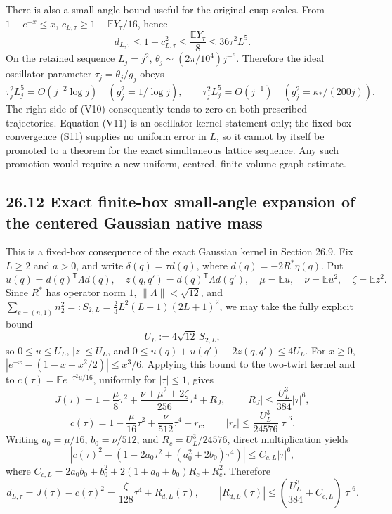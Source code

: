 \documentclass[
  11pt,
]{article}
\begin{document}
There is also a small-angle bound useful for the original cusp scales.
From \(1-e^{-x}\le x\), \(c_{L,\tau}\ge1-\mathbb EY_\tau/16\), hence \[
 d_{L,\tau}\le1-c_{L,\tau}^2
 \le\frac{\mathbb EY_\tau}{8}
 \le36\tau^2L^5. \tag{V10}
\] On the retained sequence \(L_j=j^2\),
\(\theta_j\sim(2\pi/10^4)j^{-6}\). Therefore the ideal oscillator
parameter \(\tau_j=\theta_j/g_j\) obeys \[
 \tau_j^2L_j^5=O(j^{-2}\log j)\quad(g_j^2=1/\log j),\qquad
 \tau_j^2L_j^5=O(j^{-1})\quad(g_j^2=\kappa_*/(200j)). \tag{V11}
\] The right side of (V10) consequently tends to zero on both prescribed
trajectories. Equation (V11) is an oscillator-kernel statement only; the
fixed-box convergence (S11) supplies no uniform error in \(L\), so it
cannot by itself be promoted to a theorem for the exact simultaneous
lattice sequence. Any such promotion would require a new uniform,
centred, finite-volume graph estimate.

\subsection{26.12 Exact finite-box small-angle expansion of the centered
Gaussian native
mass}\label{exact-finite-box-small-angle-expansion-of-the-centered-gaussian-native-mass}

This is a fixed-box consequence of the exact Gaussian kernel in Section
26.9. Fix \(L\ge2\) and \(a>0\), and write \(\delta(q)=\tau d(q)\),
where \(d(q)=-2R^*\eta(q)\). Put \[
u(q)=d(q)^{\mathsf T}\Lambda d(q),\quad z(q,q')=d(q)^{\mathsf T}\Lambda d(q'),\quad \mu=\mathbb E u,\quad \nu=\mathbb E u^2,\quad \zeta=\mathbb E z^2.
\] Since \(R^*\) has operator norm \(1\), \(\|\Lambda\|<\sqrt{12}\), and
\(\sum_{e=(n,1)}n_2^2=:S_{2,L}=\frac23L^2(L+1)(2L+1)^2\), we may take
the fully explicit bound \[
 U_L:=4\sqrt{12}\,S_{2,L},
\] so \(0\le u\le U_L\), \(|z|\le U_L\), and
\(0\le u(q)+u(q')-2z(q,q')\le4U_L\). For \(x\ge0\),
\(|e^{-x}-(1-x+x^2/2)|\le x^3/6\). Applying this bound to the two-twirl
kernel and to \(c(\tau)=\mathbb E e^{-\tau^2u/16}\), uniformly for
\(|\tau|\le1\), gives \[
J(\tau)=1-\frac{\mu}{8}\tau^2+\frac{\nu+\mu^2+2\zeta}{256}\tau^4+R_J,
\qquad |R_J|\le\frac{U_L^3}{384}|\tau|^6,
\] \[
c(\tau)=1-\frac{\mu}{16}\tau^2+\frac{\nu}{512}\tau^4+r_c,
\qquad |r_c|\le\frac{U_L^3}{24576}|\tau|^6.
\] Writing \(a_0=\mu/16\), \(b_0=\nu/512\), and \(R_c=U_L^3/24576\),
direct multiplication yields \[
\left|c(\tau)^2-\left(1-2a_0\tau^2+(a_0^2+2b_0)\tau^4\right)\right|
\le C_{c,L}|\tau|^6,
\] where \(C_{c,L}=2a_0b_0+b_0^2+2(1+a_0+b_0)R_c+R_c^2\). Therefore \[
d_{L,\tau}=J(\tau)-c(\tau)^2=\frac{\zeta}{128}\tau^4+R_{d,L}(\tau),
\qquad |R_{d,L}(\tau)|\le\left(\frac{U_L^3}{384}+C_{c,L}\right)|\tau|^6.
\]
\end{document}
